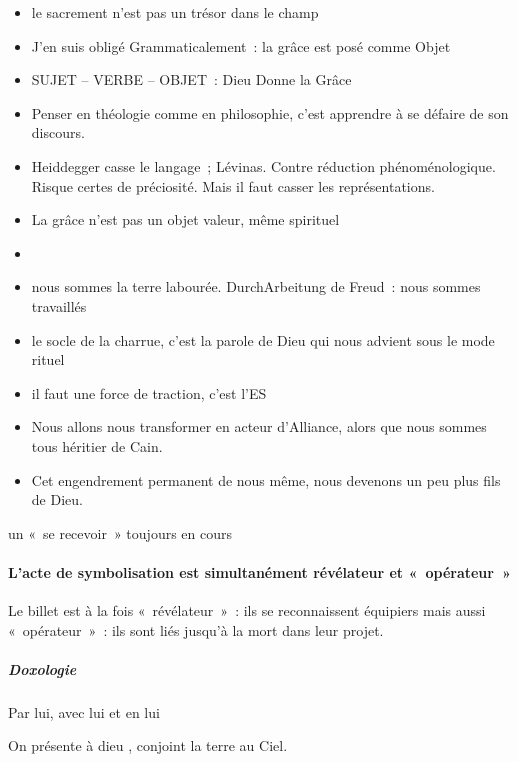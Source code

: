 \begin{itemize}
\item
  le sacrement n'est pas un trésor dans le champ
\item
  J'en suis obligé Grammaticalement~: la grâce est posé comme Objet
\item
  SUJET -- VERBE -- OBJET~: Dieu Donne la Grâce
\item
  Penser en théologie comme en philosophie, c'est apprendre à se défaire
  de son discours.
\item
  Heiddegger casse le langage~; Lévinas. Contre réduction
  phénoménologique. Risque certes de préciosité. Mais il faut casser les
  représentations.
\item
  La grâce n'est pas un objet valeur, même spirituel
\item
\item
  nous sommes la terre labourée. DurchArbeitung de Freud~: nous sommes
  travaillés
\item
  le socle de la charrue, c'est la parole de Dieu qui nous advient sous
  le mode rituel
\item
  il faut une force de traction, c'est l'ES
\item
  Nous allons nous transformer en acteur d'Alliance, alors que nous
  sommes tous héritier de Cain.
\item
  Cet engendrement permanent de nous même, nous devenons un peu plus
  fils de Dieu.
\end{itemize}

\begin{Def}[Grâce]
 un «~se recevoir~» toujours en cours
\end{Def}
  

\hypertarget{lacte-de-symbolisation-est-simultanuxe9ment-ruxe9vuxe9lateur-et-opuxe9rateur}{%
\paragraph{L'acte de symbolisation est simultanément révélateur et
«~opérateur~»}\label{lacte-de-symbolisation-est-simultanuxe9ment-ruxe9vuxe9lateur-et-opuxe9rateur}}

Le billet est à la fois «~révélateur~»~: ils se reconnaissent équipiers
mais aussi «~opérateur~»~: ils sont liés jusqu'à la mort dans leur
projet.

\hypertarget{doxologie}{%
\subparagraph{Doxologie}\label{doxologie}}

Par lui, avec lui et en lui

On présente à dieu , conjoint la terre au Ciel.

